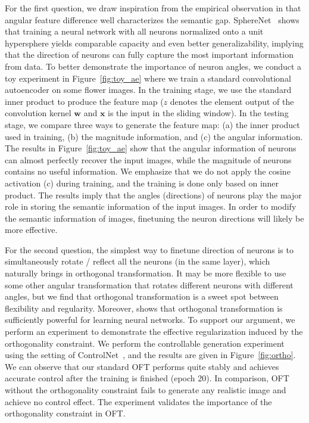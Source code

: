For the first question, we draw inspiration from the empirical observation in \cite{liu2018decoupled,chen2020angular} that angular feature difference well characterizes the semantic gap. SphereNet~\cite{liu2017deep} shows that training a neural network with all neurons normalized onto a unit hypersphere yields comparable capacity and even better generalizability, implying that the direction of neurons can fully capture the most important information from data. To better demonstrate the importance of neuron angles, we conduct a toy experiment in Figure~\ref{fig:toy_ae} where we train a standard convolutional autoencoder on some flower images. In the training stage, we use the standard inner product to produce the feature map ($z$ denotes the element output of the convolution kernel $\bm{w}$ and $\bm{x}$ is the input in the sliding window). In the testing stage, we compare three ways to generate the feature map: (a) the inner product used in training, (b) the magnitude information, and (c) the angular information. The results in Figure~\ref{fig:toy_ae} show that the angular information of neurons can almost perfectly recover the input images, while the magnitude of neurons contains no useful information. We emphasize that we do not apply the cosine activation (c) during training, and the training is done only based on inner product. The results imply that the angles (directions) of neurons play the major role in storing the semantic information of the input images. In order to modify the semantic information of images, finetuning the neuron directions will likely be more effective.

For the second question, the simplest way to finetune direction of neurons is to simultaneously rotate / reflect all the neurons (in the same layer), which naturally brings in orthogonal transformation. It may be more flexible to use some other angular transformation that rotates different neurons with different angles, but we find that orthogonal transformation is a sweet spot between flexibility and regularity. Moreover, \cite{liu2021orthogonal} shows that orthogonal transformation is sufficiently powerful for learning neural networks. To support our argument, we perform an experiment to demonstrate the effective regularization induced by the orthogonality constraint. We perform the controllable generation experiment using the setting of ControlNet~\cite{zhang2023adding}, and the results are given in Figure~\ref{fig:ortho}. We can observe that our standard OFT performs quite stably and achieves accurate control after the training is finished (epoch 20). In comparison, OFT without the orthogonality constraint fails to generate any realistic image and achieve no control effect. The experiment validates the importance of the orthogonality constraint in OFT.

